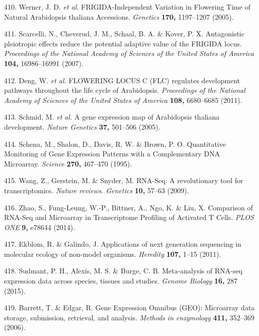 \documentclass[12pt,]{book}
\begin{document}
\hypertarget{ref-werner_frigida_independent_2005}{}
410. Werner, J. D. \emph{et al.} FRIGIDA-Independent Variation in
Flowering Time of Natural Arabidopsis thaliana Accessions.
\emph{Genetics} \textbf{170,} 1197--1207 (2005).

\hypertarget{ref-scarcelli_antagonistic_2007}{}
411. Scarcelli, N., Cheverud, J. M., Schaal, B. A. \& Kover, P. X.
Antagonistic pleiotropic effects reduce the potential adaptive value of
the FRIGIDA locus. \emph{Proceedings of the National Academy of Sciences
of the United States of America} \textbf{104,} 16986--16991 (2007).

\hypertarget{ref-deng_flowering_2011}{}
412. Deng, W. \emph{et al.} FLOWERING LOCUS C (FLC) regulates
development pathways throughout the life cycle of Arabidopsis.
\emph{Proceedings of the National Academy of Sciences of the United
States of America} \textbf{108,} 6680--6685 (2011).

\hypertarget{ref-schmid_gene_2005}{}
413. Schmid, M. \emph{et al.} A gene expression map of Arabidopsis
thaliana development. \emph{Nature Genetics} \textbf{37,} 501--506
(2005).

\hypertarget{ref-schena_quantitative_1995}{}
414. Schena, M., Shalon, D., Davis, R. W. \& Brown, P. O. Quantitative
Monitoring of Gene Expression Patterns with a Complementary DNA
Microarray. \emph{Science} \textbf{270,} 467--470 (1995).

\hypertarget{ref-wang_rna_seq_2009}{}
415. Wang, Z., Gerstein, M. \& Snyder, M. RNA-Seq: A revolutionary tool
for transcriptomics. \emph{Nature reviews. Genetics} \textbf{10,} 57--63
(2009).

\hypertarget{ref-zhao_comparison_2014}{}
416. Zhao, S., Fung-Leung, W.-P., Bittner, A., Ngo, K. \& Liu, X.
Comparison of RNA-Seq and Microarray in Transcriptome Profiling of
Activated T Cells. \emph{PLOS ONE} \textbf{9,} e78644 (2014).

\hypertarget{ref-ekblom_applications_2011}{}
417. Ekblom, R. \& Galindo, J. Applications of next generation
sequencing in molecular ecology of non-model organisms. \emph{Heredity}
\textbf{107,} 1--15 (2011).

\hypertarget{ref-sudmant_meta_analysis_2015}{}
418. Sudmant, P. H., Alexis, M. S. \& Burge, C. B. Meta-analysis of
RNA-seq expression data across species, tissues and studies.
\emph{Genome Biology} \textbf{16,} 287 (2015).

\hypertarget{ref-barrett_gene_2006}{}
419. Barrett, T. \& Edgar, R. Gene Expression Omnibus (GEO): Microarray
data storage, submission, retrieval, and analysis. \emph{Methods in
enzymology} \textbf{411,} 352--369 (2006).
\end{document}
